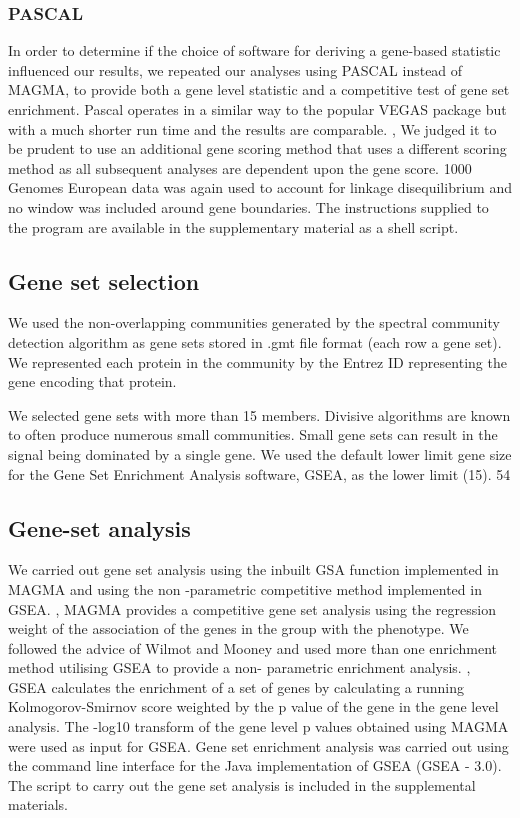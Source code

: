 \subsubsection{PASCAL}
\label{sec:PASCAL community detection}
In order to determine if the choice of software for deriving a gene-based statistic influenced our results, we repeated our analyses using PASCAL instead of MAGMA, to provide both a gene level statistic and a competitive test of gene set enrichment. \cite{lamparter2016fast}  Pascal operates in a similar way to the popular VEGAS package but with a much shorter run time and the results are comparable. \cite{lamparter2016fast},\cite{liu2010versatile}  We judged it to be prudent to use an additional gene scoring method that uses a different scoring method as all subsequent analyses are dependent upon the gene score. 1000 Genomes European data was again used to account for linkage disequilibrium and no window was included around gene boundaries. The instructions supplied to the program are available in the supplementary material as a shell script. 

\subsection{Gene set selection}
We used the non-overlapping communities generated by the spectral community detection algorithm as gene sets stored in .gmt file format (each row a gene set). We represented each protein in the community by the Entrez ID representing the gene encoding that protein. 

We selected gene sets with more than 15 members. Divisive algorithms are known to often produce numerous small communities. Small gene sets can result in the signal being dominated by a single gene. We used the default lower limit gene size for the Gene Set Enrichment Analysis software, GSEA, as the lower limit (15). 54  

\subsection{Gene-set analysis}

We carried out gene set analysis using the inbuilt GSA function implemented in MAGMA and using the non -parametric competitive method implemented in GSEA. \cite{de2015magma},\cite{subramanian2005gene}  MAGMA provides a competitive gene set analysis using the regression weight of the association of the genes in the group with the phenotype. \cite{de2015magma}  We followed the advice of Wilmot and Mooney and used more than one enrichment method utilising GSEA to provide a non- parametric enrichment analysis. \cite{subramanian2005gene},\cite{mooney2015gene}  GSEA calculates the enrichment of a set of genes by calculating a running Kolmogorov-Smirnov score weighted by the p value of the gene in the gene level analysis. The -log10 transform of the gene level p values obtained using MAGMA were used as input for GSEA. Gene set enrichment analysis was carried out using the command line interface for the Java implementation of GSEA (GSEA - 3.0). The script to carry out the gene set analysis is included in the supplemental materials. 

